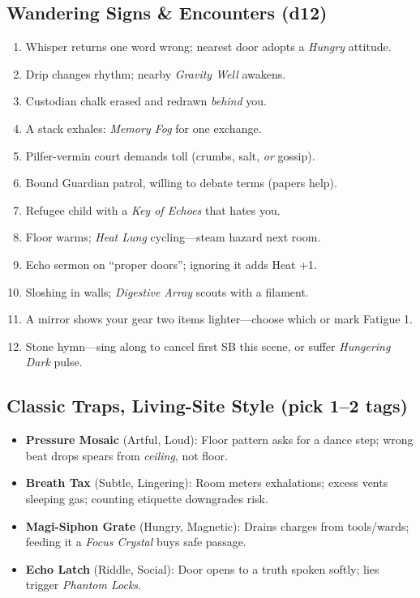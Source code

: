 \subsection*{Wandering Signs \& Encounters (d12)}
\label{sec:dungeon-wander}
\begin{enumerate}
  \item Whisper returns one word wrong; nearest door adopts a \emph{Hungry} attitude.
  \item Drip changes rhythm; nearby \emph{Gravity Well} awakens.
  \item Custodian chalk erased and redrawn \emph{behind} you.
  \item A stack exhales: \emph{Memory Fog} for one exchange.
  \item Pilfer-vermin court demands toll (crumbs, salt, \emph{or} gossip).
  \item Bound Guardian patrol, willing to debate terms (papers help).
  \item Refugee child with a \emph{Key of Echoes} that hates you.
  \item Floor warms; \emph{Heat Lung} cycling—steam hazard next room.
  \item Echo sermon on “proper doors”; ignoring it adds Heat +1.
  \item Sloshing in walls; \emph{Digestive Array} scouts with a filament.
  \item A mirror shows your gear two items lighter—choose which or mark Fatigue 1.
  \item Stone hymn—sing along to cancel first SB this scene, or suffer \emph{Hungering Dark} pulse.
\end{enumerate}

\subsection*{Classic Traps, Living-Site Style (pick 1–2 tags)}
\label{sec:dungeon-traps}
\begin{itemize}
  \item \textbf{Pressure Mosaic} (Artful, Loud): Floor pattern asks for a dance step; wrong beat drops spears from \emph{ceiling}, not floor.
  \item \textbf{Breath Tax} (Subtle, Lingering): Room meters exhalations; excess vents sleeping gas; counting etiquette downgrades risk.
  \item \textbf{Magi-Siphon Grate} (Hungry, Magnetic): Drains charges from tools/wards; feeding it a \emph{Focus Crystal} buys safe passage.
  \item \textbf{Echo Latch} (Riddle, Social): Door opens to a truth spoken softly; lies trigger \emph{Phantom Locks}.
\end{itemize}

